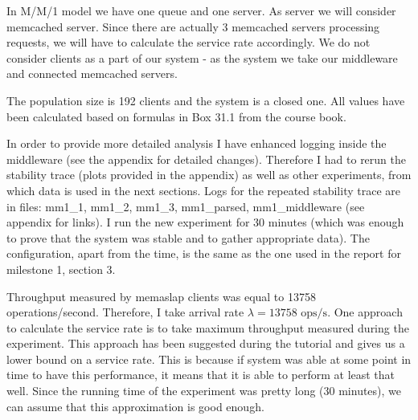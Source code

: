 \documentclass[11pt]{article}
\begin{document}
In M/M/1 model we have one queue and one server. As server we will consider memcached server. Since there are actually 3 memcached servers processing requests, we will have to calculate the service rate accordingly. We do not consider clients as a part of our system - as the system we take our middleware and connected memcached servers.

The population size is 192 clients and the system is a closed one. All values have been calculated based on formulas in Box 31.1 from the course book.

In order to provide more detailed analysis I have enhanced logging inside the middleware (see the appendix for detailed changes). Therefore I had to rerun the stability trace (plots provided in the appendix) as well as other experiments, from which data is used in the next sections. Logs for the repeated stability trace are in files: mm1\_1, mm1\_2, mm1\_3, mm1\_parsed, mm1\_middleware (see appendix for links). I run the new experiment for 30 minutes (which was enough to prove that the system was stable and to gather appropriate data). The configuration, apart from the time, is the same as the one used in the report for milestone 1, section 3.

Throughput measured by memaslap clients was equal to 13758 operations/second. Therefore, I take arrival rate $\lambda = 13758 \textrm{ ops/s}$. One approach to calculate the service rate is to take maximum throughput measured during the experiment. This approach has been suggested during the tutorial and gives us a lower bound on a service rate. This is because if system was able at some point in time to have this performance, it means that it is able to perform at least that well. Since the running time of the experiment was pretty long (30 minutes), we can assume that this approximation is good enough.
\end{document}
